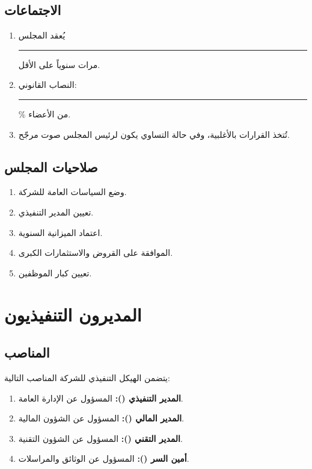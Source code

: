 \documentclass[12pt,a4paper]{article}
\begin{document}
\subsection{الاجتماعات}
\begin{enumerate}
    \item يُعقد المجلس \rule{2cm}{0.4pt} مرات سنوياً على الأقل.
    \item النصاب القانوني: \rule{2cm}{0.4pt}\% من الأعضاء.
    \item تُتخذ القرارات بالأغلبية، وفي حالة التساوي يكون لرئيس المجلس صوت مرجّح.
\end{enumerate}

\subsection{صلاحيات المجلس}
\begin{enumerate}
    \item وضع السياسات العامة للشركة.
    \item تعيين المدير التنفيذي.
    \item اعتماد الميزانية السنوية.
    \item الموافقة على القروض والاستثمارات الكبرى.
    \item تعيين كبار الموظفين.
\end{enumerate}

\section{المديرون التنفيذيون}
\label{ch:officers}

\subsection{المناصب}
يتضمن الهيكل التنفيذي للشركة المناصب التالية:
\begin{enumerate}
    \item \textbf{المدير التنفيذي ():} المسؤول عن الإدارة العامة.
    \item \textbf{المدير المالي ():} المسؤول عن الشؤون المالية.
    \item \textbf{المدير التقني ():} المسؤول عن الشؤون التقنية.
    \item \textbf{أمين السر ():} المسؤول عن الوثائق والمراسلات.
\end{enumerate}
\end{document}
